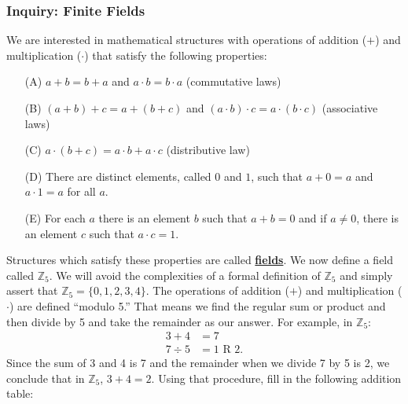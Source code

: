 \documentclass[11pt]{article}
\renewcommand\emph[1]{\underline{\bf{#1}}} %
\theoremstyle{definition}
\begin{document}
\subsubsection{Inquiry: Finite Fields}

  We are interested in mathematical structures with operations of addition ($+$) and multiplication ($\cdot$) that satisfy the following properties:
  \begin{itemize}
    \item[(A)] $a+b=b+a$ and $a\cdot b=b\cdot a$ (commutative laws)
    \item[(B)] $(a+b)+c = a + (b+c)$ and $(a\cdot b)\cdot c = a\cdot (b \cdot c)$ (associative laws)
    \item[(C)] $a\cdot (b+c) = a\cdot b + a \cdot c$ (distributive law)
    \item[(D)] There are distinct elements, called $0$ and $1$, such that $a+0 = a $ and $a \cdot 1 = a$ for all $a$.
    \item[(E)] For each $a$ there is an element $b$ such that $a + b = 0$ and if $a\neq 0$, there is an element $c$ such that $a\cdot c = 1$.
  \end{itemize}
  Structures which satisfy these properties are called \emph{fields}. We now define a field called $\mathbb{Z}_5$. We will avoid the complexities of a formal definition of $\mathbb{Z}_5$ and simply assert that 
  $\mathbb{Z}_5 = \{ 0, 1, 2, 3, 4\}$. The operations of addition ($+$) and multiplication ($\cdot$) are defined ``modulo 5.'' That means we find
  the regular sum or product and then divide by 5 and take the remainder as our answer. For example, in $\mathbb{Z}_5$:
  \begin{align*}
    3 + 4 &= 7\\
    7 \div 5 &= 1 \text{ R } 2.
  \end{align*}
  Since the sum of 3 and 4 is 7 and the remainder when we divide 7 by 5 is 2, we conclude that in $\mathbb{Z}_5$, $3 + 4 = 2$. Using that procedure, fill in
  the following addition table:
\end{document}
